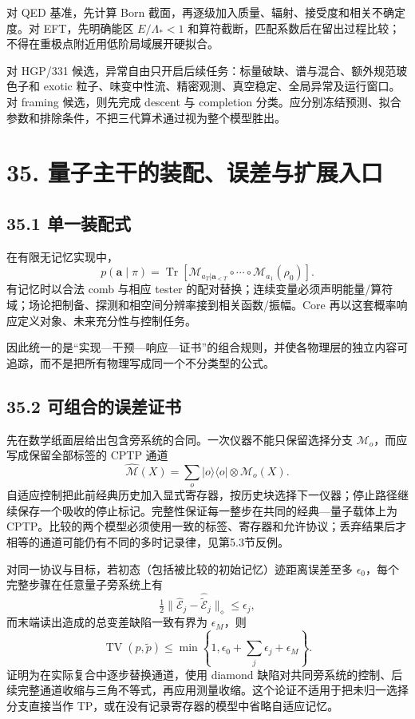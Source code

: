 \documentclass[
  11pt,
  oneside]{book}
\begin{document}
对 QED 基准，先计算 Born
截面，再逐级加入质量、辐射、接受度和相关不确定度。对 EFT，先明确能区
\(E/\Lambda_*<1\)
和算符截断，匹配系数后在留出过程比较；不得在重极点附近用低阶局域展开硬拟合。

对 HGP/331
候选，异常自由只开启后续任务：标量破缺、谱与混合、额外规范玻色子和
exotic 粒子、味变中性流、精密观测、真空稳定、全局异常及运行窗口。对
framing 候选，则先完成 descent 与 completion
分类。应分别冻结预测、拟合参数和排除条件，不把三代算术通过视为整个模型胜出。

\hypertarget{ch-35}{%
\chapter{35. 量子主干的装配、误差与扩展入口}\label{ch-35}}

\hypertarget{ux5355ux4e00ux88c5ux914dux5f0f}{%
\section{35.1 单一装配式}\label{ux5355ux4e00ux88c5ux914dux5f0f}}

在有限无记忆实现中， \[
p(\mathbf a\mid\pi)=
\operatorname{Tr}\!\left[
\mathcal M_{a_T|\mathbf a_{<T}}\circ\cdots\circ
\mathcal M_{a_1}(\rho_0)\right].
\] 有记忆时以合法 comb 与相应 tester
的配对替换；连续变量必须声明能量/算符域；场论把制备、探测和相空间分辨率接到相关函数/振幅。Core
再以这套概率响应定义对象、未来充分性与控制任务。

因此统一的是``实现---干预---响应---证书''的组合规则，并使各物理层的独立内容可追踪，而不是把所有物理写成同一个不分类型的公式。

\hypertarget{ux53efux7ec4ux5408ux7684ux8befux5deeux8bc1ux4e66}{%
\section{35.2
可组合的误差证书}\label{ux53efux7ec4ux5408ux7684ux8befux5deeux8bc1ux4e66}}

先在数学纸面层给出包含旁系统的合同。一次仪器不能只保留选择分支
\(\mathcal M_o\)，而应写成保留全部标签的 CPTP 通道 \[
\widehat{\mathcal M}(X)=\sum_o|o\rangle\langle o|\otimes\mathcal M_o(X).
\]
自适应控制把此前经典历史加入显式寄存器，按历史块选择下一仪器；停止路径继续保存一个吸收的停止标记。完整性保证每一整步在共同的经典---量子载体上为
CPTP。比较的两个模型必须使用一致的标签、寄存器和允许协议；丢弃结果后才相等的通道可能仍有不同的多时记录律，见第5.3节反例。

对同一协议与目标，若初态（包括被比较的初始记忆）迹距离误差至多
\(\epsilon_0\)，每个完整步骤在任意量子旁系统上有 \[
\tfrac12\|\widehat{\mathcal E}_j-\widehat{\widetilde{\mathcal E}}_j\|_\diamond
\le\epsilon_j,
\] 而末端读出造成的总变差缺陷一致有界为 \(\epsilon_M\)，则 \[
\operatorname{TV}(p,\widetilde p)
\le\min\left\{1,\epsilon_0+\sum_j\epsilon_j+\epsilon_M\right\}.
\] 证明为在实际复合中逐步替换通道，使用 diamond
缺陷对共同旁系统的控制、后续完整通道收缩与三角不等式，再应用测量收缩。这个论证不适用于把未归一选择分支直接当作
TP，或在没有记录寄存器的模型中省略自适应记忆。
\end{document}
